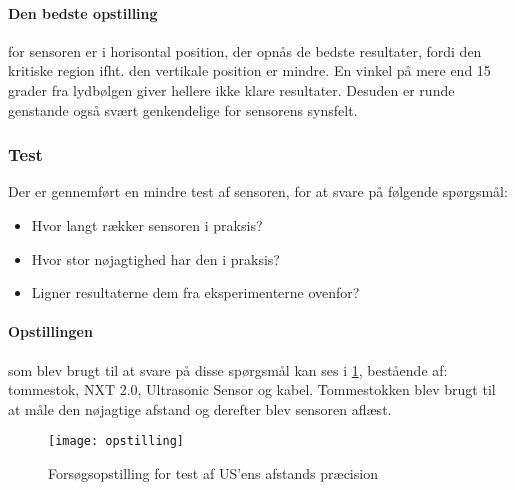 \paragraph{Den bedste opstilling} for sensoren er i horisontal position, der opnås de bedste resultater, fordi den kritiske region ifht. den vertikale position er mindre.
En vinkel på mere end 15 grader fra lydbølgen giver hellere ikke klare resultater.
Desuden er runde genstande også svært genkendelige for sensorens synsfelt.

\subsubsection{Test}
Der er gennemført en mindre test af sensoren, for at svare på følgende spørgsmål:

\begin{itemize}
\item Hvor langt rækker sensoren i praksis?
\item Hvor stor nøjagtighed har den i praksis?
\item Ligner resultaterne dem fra eksperimenterne ovenfor?
\end{itemize}

\paragraph{Opstillingen} som blev brugt til at svare på disse spørgsmål kan ses i \cref{sensor:ultrasonic_opstilling}, bestående af: tommestok, NXT 2.0, \legoms Ultrasonic Sensor og \legoms kabel.
Tommestokken blev brugt til at måle den nøjagtige afstand og derefter blev sensoren aflæst.

\begin{figure}[h]
\centering
\texttt{[image: opstilling]}
\caption{Forsøgsopstilling for test af US'ens afstands præcision}
\label{sensor:ultrasonic_opstilling}
\end{figure}

